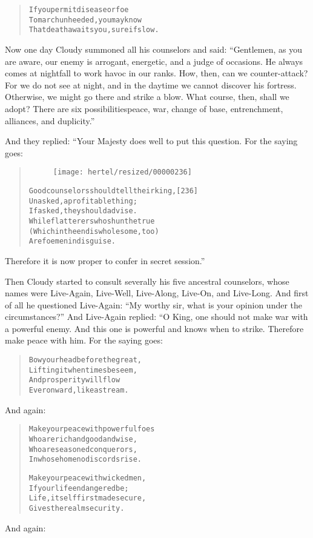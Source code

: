 \documentclass[article, twoside, 10pt]{memoir}
\renewenvironment{verbatim}{%
\begin{quote}%
\vskip -10pt%
\begin{alltt}\normalfont\small}{\end{alltt}%
\end{quote}%
\vskip -10pt
} %
\begin{document}
\begin{verbatim}
If you permit disease or foe
To march unheeded, you may know
That death awaits you, sure if slow.
\end{verbatim}
Now one day Cloudy summoned all his counselors and said:
``Gentlemen, as you are aware, our enemy is arrogant, energetic, and a judge of occasions. He always comes at nightfall to work havoc in our ranks. How, then, can we counter-attack? For we do not see at night, and in the daytime we cannot discover his fortress. Otherwise, we might go there and strike a blow. What course, then, shall we adopt? There are six possibilities{\textemdash}peace, war, change of base, entrenchment, alliances, and duplicity.''

And they replied: “Your Majesty does well to put this question. For
the saying goes:

\begin{verbatim}
\begin{figure}[p]\texttt{[image: hertel/resized/00000236]}\end{figure}Good counselors should tell their king,                 [236]
Unasked, a profitable thing;
    If asked, they should advise.
While flatterers who shun the true
(Which in the end is wholesome, too)
    Are foemen in disguise.
\end{verbatim}
Therefore it is now proper to confer in secret session.”

Then Cloudy started to consult severally his five ancestral
counselors, whose names were Live-Again, Live-Well, Live-Along,
Live-On, and Live-Long. And first of all he questioned Live-Again:
``My worthy sir, what is your opinion under the circumstances?''
And Live-Again replied: “O King, one should not make war with a
powerful enemy. And this one is powerful and knows when to strike.
Therefore make peace with him. For the saying goes:

\begin{verbatim}
Bow your head before the great,
    Lifting it when times beseem,
And prosperity will flow
    Ever onward, like a stream.
\end{verbatim}
And again:

\begin{verbatim}
Make your peace with powerful foes
    Who are rich and good and wise,
Who are seasoned conquerors,
In whose home no discords rise.

Make your peace with wicked men,
    If your life endangered be;
Life, itself first made secure,
    Gives the realm security.
\end{verbatim}
And again:
\end{document}
